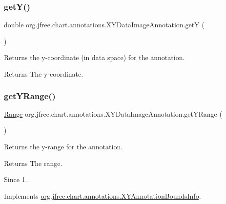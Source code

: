 \subsubsection{\texorpdfstring{get\+Y()}{getY()}}
{\footnotesize\ttfamily double org.\+jfree.\+chart.\+annotations.\+X\+Y\+Data\+Image\+Annotation.\+getY (\begin{DoxyParamCaption}{ }\end{DoxyParamCaption})}

Returns the y-\/coordinate (in data space) for the annotation.

\begin{DoxyReturn}{Returns}
The y-\/coordinate. 
\end{DoxyReturn}
\mbox{\label{classorg_1_1jfree_1_1chart_1_1annotations_1_1_x_y_data_image_annotation_ad202fa771cea47d7b5b141e76a198c06}} 
\subsubsection{\texorpdfstring{get\+Y\+Range()}{getYRange()}}
{\footnotesize\ttfamily \mbox{\hyperlink{classorg_1_1jfree_1_1data_1_1_range}{Range}} org.\+jfree.\+chart.\+annotations.\+X\+Y\+Data\+Image\+Annotation.\+get\+Y\+Range (\begin{DoxyParamCaption}{ }\end{DoxyParamCaption})}

Returns the y-\/range for the annotation.

\begin{DoxyReturn}{Returns}
The range.
\end{DoxyReturn}
\begin{DoxySince}{Since}
1.. 
\end{DoxySince}


Implements \mbox{\hyperlink{interfaceorg_1_1jfree_1_1chart_1_1annotations_1_1_x_y_annotation_bounds_info_ac2b862c20ed8685be1b5c445abdf2f00}{org.\+jfree.\+chart.\+annotations.\+X\+Y\+Annotation\+Bounds\+Info}}.

\mbox{\label{classorg_1_1jfree_1_1chart_1_1annotations_1_1_x_y_data_image_annotation_a96bbbed6ae06f857b828d7b200facf56}} 
